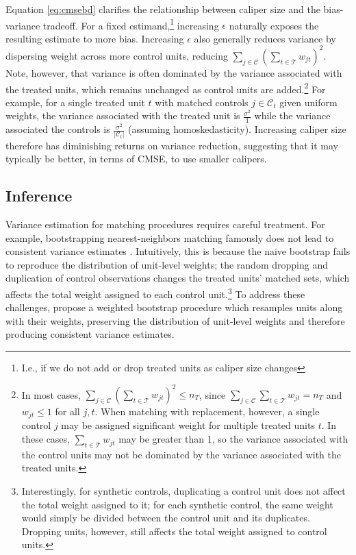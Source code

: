 \documentclass{article}
\newcommand{\Ct}{\mathcal{C}_{t}}
\begin{document}
Equation \ref{eq:cmsebd} clarifies the relationship between caliper size and the bias-variance tradeoff.
For a fixed estimand,\footnote{I.e., if we do not add or drop treated units as caliper size changes} increasing $\epsilon$ naturally exposes the resulting estimate to more bias.
Increasing $\epsilon$ also generally reduces variance by dispersing weight across more control units, reducing $\sum_{j \in \mathcal{C}} (\sum_{t \in \mathcal{T}} w_{jt})^2$.
Note, however, that variance is often dominated by the variance associated with the treated units, which remains unchanged as control units are added.\footnote{In most cases, $\sum_{j \in \mathcal{C}} (\sum_{t \in \mathcal{T}} w_{jt})^2 \leq n_T$, since $\sum_{j \in \mathcal{C}} \sum_{t \in \mathcal{T}} w_{jt} = n_T$ and $w_{jt} \leq 1$ for all $j, t$.
When matching with replacement, however, a single control $j$ may be assigned significant weight for multiple treated units $t$.
In these cases, $\sum_{t \in \mathcal{T}} w_{jt}$ may be greater than 1, so the variance associated with the control units may not be dominated by the variance associated with the treated units.}
For example, for a single treated unit $t$ with matched controls $j \in \Ct$ given uniform weights, the variance associated with the treated unit is
$\frac{\sigma^2}{1}$ while the variance associated the controls is $\frac{\sigma^2}{|\Ct|}$ (assuming homoskedasticity).
Increasing caliper size therefore has diminishing returns on variance reduction, suggesting that it may typically be better, in terms of CMSE, to use smaller calipers.


\subsection{Inference}


Variance estimation for matching procedures requires careful treatment.
For example, bootstrapping nearest-neighbors matching famously does not lead to consistent variance estimates \citep{abadie2008failure}.
Intuitively, this is because the naive bootstrap fails to reproduce the distribution of unit-level weights;
the random dropping and duplication of control observations changes the treated units' matched sets, which affects the total weight assigned to each control unit.\footnote{Interestingly, for synthetic controls, duplicating a control unit does not affect the total weight assigned to it; for each synthetic control, the same weight would simply be divided between the control unit and its duplicates. Dropping units, however, still affects the total weight assigned to control units.}
To address these challenges, \citet{otsu2017bootstrap} propose a weighted bootstrap procedure which resamples units along with their weights, preserving the distribution of unit-level weights and therefore producing consistent variance estimates.
\end{document}
